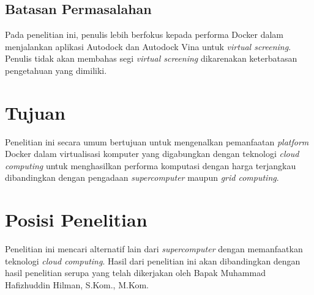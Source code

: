 \subsection{Batasan Permasalahan}
Pada penelitian ini, penulis lebih berfokus kepada performa Docker dalam menjalankan aplikasi Autodock dan Autodock Vina untuk \textit{virtual screening}. Penulis tidak akan membahas segi \textit{virtual screening} dikarenakan keterbatasan pengetahuan yang dimiliki. 

\section{Tujuan}
Penelitian ini secara umum bertujuan untuk mengenalkan pemanfaatan \textit{platform} Docker dalam virtualisasi komputer yang digabungkan dengan teknologi \textit{cloud computing} untuk menghasilkan performa komputasi dengan harga terjangkau dibandingkan dengan pengadaan \textit{supercomputer} maupun \textit{grid computing}.


\section{Posisi Penelitian}
Penelitian ini mencari alternatif lain dari \textit{supercomputer} dengan memanfaatkan teknologi \textit{cloud computing}. Hasil dari penelitian ini akan dibandingkan dengan hasil penelitian serupa yang telah dikerjakan oleh Bapak Muhammad Hafizhuddin Hilman, S.Kom., M.Kom.

